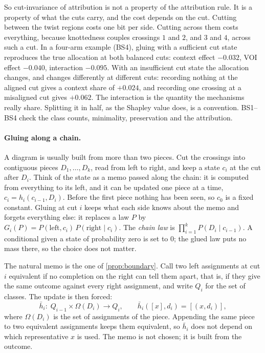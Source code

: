\documentclass[11pt]{article}
\theoremstyle{definition}\newtheorem{definition}[theorem]{Definition}\newtheorem{remark}[theorem]{Remark}\newtheorem{example}[theorem]{Example}\newtheorem{problem}[theorem]{Open problem}\crefname{problem}{Problem}{Problems}
\begin{document}
So cut-invariance of attribution is not a property of the attribution rule. It is a property of what the cuts carry, and the cost depends on the cut. Cutting between the twist regions costs one bit per side. Cutting across them costs everything, because knottedness couples crossings $1$ and $2$, and $3$ and $4$, across such a cut. In a four-arm example (BS4), gluing with a sufficient cut state reproduces the true allocation at both balanced cuts: context effect $-0.032$, VOI effect $-0.040$, interaction $-0.095$. With an insufficient cut state the allocation changes, and changes differently at different cuts: recording nothing at the aligned cut gives a context share of $+0.024$, and recording one crossing at a misaligned cut gives $+0.062$. The interaction is the quantity the mechanisms really share. Splitting it in half, as the Shapley value does, is a convention. BS1--BS4 check the class counts, minimality, preservation and the attribution.

\paragraph{Gluing along a chain.} A diagram is usually built from more than two pieces. Cut the crossings into contiguous pieces $D_1,\dots,D_k$, read from left to right, and keep a state $c_i$ at the cut after $D_i$. Think of the state as a memo passed along the chain: it is computed from everything to its left, and it can be updated one piece at a time, $c_i=h_i(c_{i-1},D_i)$. Before the first piece nothing has been seen, so $c_0$ is a fixed constant. Gluing at cut $i$ keeps what each side knows about the memo and forgets everything else: it replaces a law $P$ by $G_i(P)=P(\text{left},c_i)\,P(\text{right}\mid c_i)$. The \emph{chain law} is $\prod_{i=1}^kP(D_i\mid c_{i-1})$. A conditional given a state of probability zero is set to $0$; the glued law puts no mass there, so the choice does not matter.

The natural memo is the one of \cref{prop:boundary}. Call two left assignments at cut $i$ equivalent if no completion on the right can tell them apart, that is, if they give the same outcome against every right assignment, and write $Q_i$ for the set of classes. The update is then forced:
\[
\bar h_i:\;Q_{i-1}\times\Omega(D_i)\to Q_i,\qquad \bar h_i([x],d_i)=[(x,d_i)],
\]
where $\Omega(D_i)$ is the set of assignments of the piece. Appending the same piece to two equivalent assignments keeps them equivalent, so $\bar h_i$ does not depend on which representative $x$ is used. The memo is not chosen; it is built from the outcome.
\end{document}

